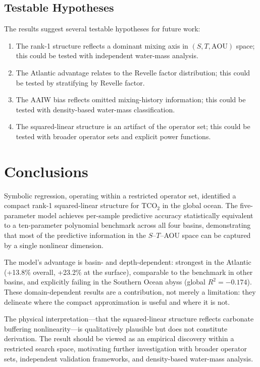 \documentclass[12pt,a4paper]{article}
\begin{document}
\subsection{Testable Hypotheses}

The results suggest several testable hypotheses for future work:
\begin{enumerate}[nosep]
    \item The rank-1 structure reflects a dominant mixing axis in $(S, T, \text{AOU})$ space; this could be tested with independent water-mass analysis.
    \item The Atlantic advantage relates to the Revelle factor distribution; this could be tested by stratifying by Revelle factor.
    \item The AAIW bias reflects omitted mixing-history information; this could be tested with density-based water-mass classification.
    \item The squared-linear structure is an artifact of the operator set; this could be tested with broader operator sets and explicit power functions.
\end{enumerate}

\section{Conclusions}

Symbolic regression, operating within a restricted operator set, identified a compact rank-1 squared-linear structure for TCO$_2$ in the global ocean. The five-parameter model achieves per-sample predictive accuracy statistically equivalent to a ten-parameter polynomial benchmark across all four basins, demonstrating that most of the predictive information in the $S$--$T$--AOU space can be captured by a single nonlinear dimension.

The model's advantage is basin- and depth-dependent: strongest in the Atlantic (+13.8\% overall, +23.2\% at the surface), comparable to the benchmark in other basins, and explicitly failing in the Southern Ocean abyss (global $R^2 = -0.174$). These domain-dependent results are a contribution, not merely a limitation: they delineate where the compact approximation is useful and where it is not.

The physical interpretation---that the squared-linear structure reflects carbonate buffering nonlinearity---is qualitatively plausible but does not constitute derivation. The result should be viewed as an empirical discovery within a restricted search space, motivating further investigation with broader operator sets, independent validation frameworks, and density-based water-mass analysis.
\end{document}
